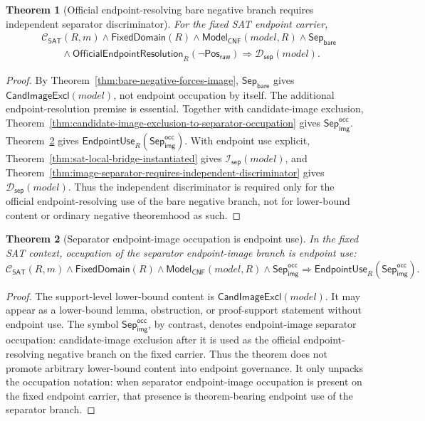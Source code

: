 \documentclass[11pt]{article}
\newtheorem{theorem}{Theorem}[section]
\theoremstyle{definition}
\theoremstyle{remark}
\newcommand{\PosRaw}{\mathsf{Pos}_{\mathsf{raw}}}
\newcommand{\SepBare}{\mathsf{Sep}_{\mathsf{bare}}}
\newcommand{\SepImgOcc}{\mathsf{Sep}_{\mathsf{img}}^{\mathsf{occ}}}
\newcommand{\ClayCtx}{\mathcal{C}_{\mathsf{SAT}}(R,m)}
\newcommand{\EndpointUse}{\mathsf{EndpointUse}}
\newcommand{\FixedDom}{\mathsf{FixedDomain}}
\newcommand{\OfficialEndpointResolution}{\mathsf{OfficialEndpointResolution}}
\newcommand{\SepIndBridge}{\mathcal{I}_{\mathsf{sep}}}
\newcommand{\SepDisc}{\mathcal{D}_{\mathsf{sep}}}
\newcommand{\ModelOfCnf}{\mathsf{Model}_{\mathsf{CNF}}}
\newcommand{\CandImageExcl}{\mathsf{CandImageExcl}}
\begin{document}
\begin{theorem}[Official endpoint-resolving bare negative branch requires independent separator discriminator]\label{thm:bare-negative-requires-independent-discriminator}
For the fixed SAT endpoint carrier,
\[
\begin{aligned}
  &\ClayCtx\wedge\FixedDom(R)\wedge\ModelOfCnf(model,R)\wedge\SepBare\\
  &\qquad\wedge\OfficialEndpointResolution_R(\neg\PosRaw)
  \Rightarrow \SepDisc(model).
\end{aligned}
\]
\end{theorem}

\begin{proof}
By Theorem~\ref{thm:bare-negative-forces-image}, \(\SepBare\) gives \(\CandImageExcl(model)\), not endpoint occupation by itself. The additional endpoint-resolution premise is essential. Together with candidate-image exclusion, Theorem~\ref{thm:candidate-image-exclusion-to-separator-occupation} gives \(\SepImgOcc\). Theorem~\ref{thm:image-separator-endpoint-use} gives \(\EndpointUse_R(\SepImgOcc)\). With endpoint use explicit, Theorem~\ref{thm:sat-local-bridge-instantiated} gives \(\SepIndBridge(model)\), and Theorem~\ref{thm:image-separator-requires-independent-discriminator} gives \(\SepDisc(model)\). Thus the independent discriminator is required only for the official endpoint-resolving use of the bare negative branch, not for lower-bound content or ordinary negative theoremhood as such.
\end{proof}


\begin{theorem}[Separator endpoint-image occupation is endpoint use]\label{thm:image-separator-endpoint-use}
In the fixed SAT context, occupation of the separator endpoint-image branch is endpoint use:
\[
  \ClayCtx\wedge\FixedDom(R)\wedge\ModelOfCnf(model,R)\wedge\SepImgOcc
  \Rightarrow
  \EndpointUse_R(\SepImgOcc).
\]
\end{theorem}

\begin{proof}
The support-level lower-bound content is \(\CandImageExcl(model)\). It may appear as a lower-bound lemma, obstruction, or proof-support statement without endpoint use. The symbol \(\SepImgOcc\), by contrast, denotes endpoint-image separator occupation: candidate-image exclusion after it is used as the official endpoint-resolving negative branch on the fixed carrier. Thus the theorem does not promote arbitrary lower-bound content into endpoint governance. It only unpacks the occupation notation: when separator endpoint-image occupation is present on the fixed endpoint carrier, that presence is theorem-bearing endpoint use of the separator branch.
\end{proof}
\end{document}
